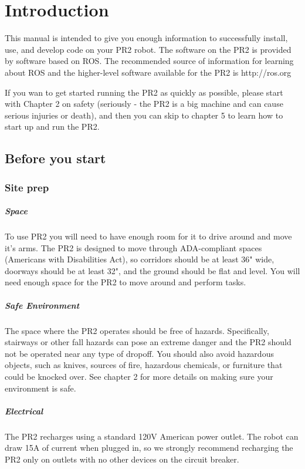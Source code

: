 \chapter {Introduction}
This manual is intended to give you enough information to successfully install, use, and develop code on your PR2 robot.  The software on the PR2 is provided by software based on ROS.  The recommended source of information for learning about ROS and the higher-level software available for the PR2 is http://ros.org

If you wan to get started running the PR2 as quickly as possible, please start with Chapter 2 on safety (seriously - the PR2 is a big machine and can cause serious injuries or death), and then you can skip to chapter 5 to learn how to start up and run the PR2.

\section{Before you start}
\subsection{Site prep}
\paragraph{Space} To use PR2 you will need to have enough room for it to drive around and move it's arms.  The PR2 is designed to move through ADA-compliant spaces (Americans with Disabilities Act), so corridors should be at least 36" wide, doorways should be at least 32", and the ground should be flat and level.  You will need enough space for the PR2 to move around and perform tasks.
\paragraph{Safe Environment} The space where the PR2 operates should be free of hazards.  Specifically, stairways or other fall hazards can pose an extreme danger and the PR2 should not be operated near any type of dropoff.  You should also avoid hazardous objects, such as knives, sources of fire, hazardous chemicals, or furniture that could be knocked over.  See chapter 2 for more details on making sure your environment is safe.
\paragraph{Electrical} The PR2 recharges using a standard 120V American power outlet.  The robot can draw 15A of current when plugged in, so we strongly recommend recharging the PR2 only on outlets with no other devices on the circuit breaker.
